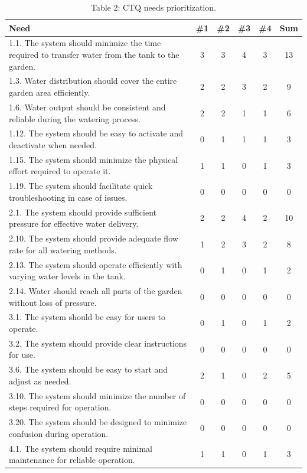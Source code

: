 \documentclass[11pt]{article}
\begin{document}
\begin{table}[H]
\centering
\caption*{Table 2: CTQ needs prioritization.}
\begin{tabular}{|p{10cm}|c|c|c|c|c|}
\hline
\textbf{Need} & \textbf{\#1} & \textbf{\#2} & \textbf{\#3} & \textbf{\#4} & \textbf{Sum} \\
\hline
1.1. The system should minimize the time required to transfer water from the tank to the garden. & 3 & 3 & 4 & 3 & 13 \cellcolor{yellow} \\
1.3. Water distribution should cover the entire garden area efficiently. & 2 & 2 & 3 & 2 & 9 \cellcolor{yellow} \\
1.6. Water output should be consistent and reliable during the watering process. & 2 & 2 & 1 & 1 & 6 \\
1.12. The system should be easy to activate and deactivate when needed. & 0 & 1 & 1 & 1 & 3 \\
1.15. The system should minimize the physical effort required to operate it. & 1 & 1 & 0 & 1 & 3 \\
1.19. The system should facilitate quick troubleshooting in case of issues. & 0 & 0 & 0 & 0 & 0 \\
\hline
2.1. The system should provide sufficient pressure for effective water delivery. & 2 & 2 & 4 & 2 & 10 \cellcolor{yellow} \\
2.10. The system should provide adequate flow rate for all watering methods. & 1 & 2 & 3 & 2 & 8 \cellcolor{yellow} \\
2.13. The system should operate efficiently with varying water levels in the tank. & 0 & 1 & 0 & 1 & 2 \\
2.14. Water should reach all parts of the garden without loss of pressure. & 0 & 0 & 0 & 0 & 0 \\
\hline
3.1. The system should be easy for users to operate. & 0 & 1 & 0 & 1 & 2 \\
3.2. The system should provide clear instructions for use. & 0 & 0 & 0 & 0 & 0 \\
3.6. The system should be easy to start and adjust as needed. & 2 & 1 & 0 & 2 & 5 \\
3.10. The system should minimize the number of steps required for operation. & 0 & 0 & 0 & 0 & 0 \\
3.20. The system should be designed to minimize confusion during operation. & 0 & 0 & 0 & 0 & 0 \\
\hline
4.1. The system should require minimal maintenance for reliable operation. & 1 & 1 & 0 & 1 & 3 \\

\end{tabular}
\end{table}
\end{document}
